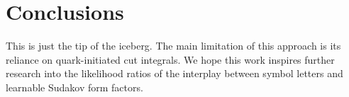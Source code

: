 \section{Conclusions}\label{sec:conclusions}

This is just the tip of the iceberg. The main limitation of this
approach is its reliance on quark-initiated cut integrals. We hope this
work inspires further research into the likelihood ratios of the
interplay between symbol letters and learnable Sudakov form factors.

